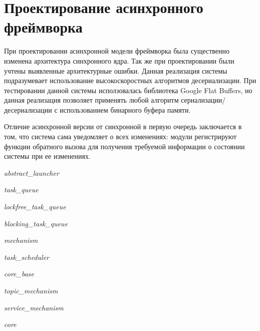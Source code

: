 \section{Проектирование асинхронного фреймворка}

При проектировании асинхронной модели фреймворка была существенно изменена архитектура синхронного ядра. Так же при проектировании были учтены выявленные архитектурные ошибки. Данная реализация системы подразумевает использование высокоскоростных алгоритмов десериализации. При тестировании данной системы исползовалась библиотека Google Flat Buffers, но данная реализация позволяет применять любой алгоритм сериализации/десериализации с использованием бинарного буфера памяти.

Отличие асинхронной версии от синхронной в первую очередь заключается в том, что система сама уведомляет о всех изменениях: модули регистрируют функции обратного вызова для получения требуемой информации о состоянии системы при ее изменениях.

\textit{abstract\_launcher}

\textit{task\_queue}

\textit{lockfree\_task\_queue}

\textit{blocking\_task\_queue}

\textit{mechanism}

\textit{task\_scheduler}

\textit{core\_base}

\textit{topic\_mechanism}

\textit{service\_mechanism}

\textit{core}

